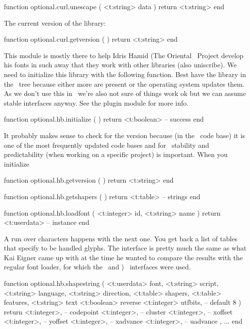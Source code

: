 function optional.curl.unescape ( <t:string> data )
    return <t:string>
end
\stoptyping

The current version of the library:

\starttyping[option=LUA]
function optional.curl.getversion ( )
    return <t:string>
end
\stoptyping

\stopsubsubsubject

\startsubsubsubject[title=hb]

This module is mostly there to help Idris Hamid (The Oriental \TEX\ Project
develop his fonts in such away that they work with other libraries (also
uniscribe). We need to initialize this library with the following function. Best
have the library in the \TEX\ tree because either more are present or the
operating system updates them. As we don't use this in \CONTEXT\ we're also not
sure of things work ok but we can assume stable interfaces anyway. See the plugin
module for more info.

\starttyping[option=LUA]
function optional.hb.initialize ( )
    return <t:boolean> -- success
end
\stoptyping

It probably makes sense to check for the version because (in the \TEXLIVE\ code
base) it is one of the most frequently updated code bases and for \TEX\ stability
and predictability (when working on a specific project) is important. When you
initialize

\starttyping[option=LUA]
function optional.hb.getversion ( )
    return <t:string>
end
\stoptyping

\starttyping[option=LUA]
function optional.hb.getshapers ( )
    return <t:table> -- strings
end
\stoptyping

\starttyping[option=LUA]
function optional.hb.loadfont (
    <t:integer> id,
    <t:string>  name
)
    return <t:userdata> -- instance
end
\stoptyping

A run over characters happens with the next one. You get back a list of tables
that specify to be handled glyphs. The interface is pretty much the same as what
Kai Eigner came up with at the time he wanted to compare the results with the
regular font loader, for which the \LUATEX\ and \LUAJITTEX) \FFI\ interfaces were
used.

\starttyping[option=LUA]
function optional.hb.shapestring (
    <t:userdata> font,
    <t:string>   script,
    <t:string>   language,
    <t:string>   direction,
    <t:table>    shapers,
    <t:table>    features,
    <t:string>   text
    <t:boolean>  reverse
    <t:integer>  utfbits, -- default 8
)
    return {
        {
            <t:integer>, -- codepoint
            <t:integer>, -- cluster
            <t:integer>, -- xoffset
            <t:integer>, -- yoffset
            <t:integer>, -- xadvance
            <t:integer>, -- uadvance
        },
        ...
    }
end
\stoptyping

